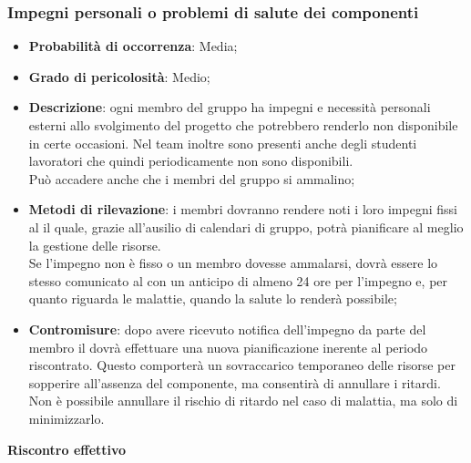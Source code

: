 		\subsubsection{Impegni personali o problemi di salute dei componenti} %
		\label{ssub:impegni_personali_dei_componenti}
			\begin{itemize}
				\item \textbf{Probabilità di occorrenza}: Media;
				\item \textbf{Grado di pericolosità}: Medio;
				\item \textbf{Descrizione}: ogni membro del gruppo ha impegni e necessità personali esterni allo svolgimento del progetto che potrebbero renderlo non disponibile in certe occasioni. Nel team inoltre sono presenti anche degli studenti lavoratori che quindi periodicamente non sono disponibili. \\
				Può accadere anche che i membri del gruppo si ammalino;
				\item \textbf{Metodi di rilevazione}: i membri dovranno rendere noti i loro impegni fissi al \roleProjectManager{} il quale, grazie all'ausilio di calendari di gruppo, potrà pianificare al meglio la gestione delle risorse. \\
				Se l'impegno non è fisso o un membro dovesse ammalarsi, dovrà essere lo stesso comunicato al \roleProjectManager{} con un anticipo di almeno 24 ore per l'impegno e, per quanto riguarda le malattie, quando la salute lo renderà possibile;
				\item \textbf{Contromisure}: dopo avere ricevuto notifica dell'impegno da parte del membro il \roleProjectManager{} dovrà effettuare una nuova pianificazione inerente al periodo riscontrato. Questo comporterà un sovraccarico temporaneo delle risorse per sopperire all'assenza del componente, ma consentirà di annullare i ritardi. \newline
				Non è possibile annullare il rischio di ritardo nel caso di malattia, ma solo di minimizzarlo.
			\end{itemize}
		\noindent
		\textbf{Riscontro effettivo}
